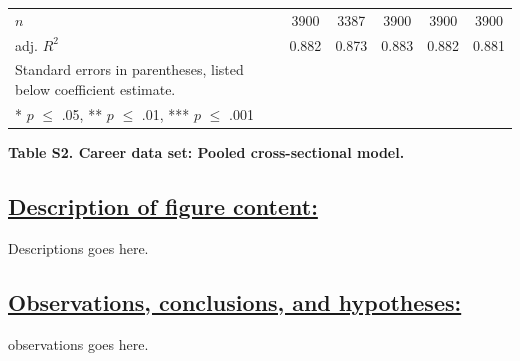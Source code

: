\documentclass{article}\usepackage[]{graphicx}\usepackage[]{color}
\begin{document}
\begin{table}[h!]
\begin{center}
\begin{tabular}{l c c c c c}
    \hline
    
    \rowcolor{gray!33} 
    $\textit{n}$
    & 3900 & 3387 & 3900 & 3900 & 3900 \\
    
    \rowcolor{gray!33} 
    adj. ${R^2}$ 
    & 0.882 & 0.873 & 0.883 & 0.882 & 0.881 \\
    
    \hline
    \hline
    
    Standard errors in parentheses, listed below coefficient estimate. \\
    {* $\textit{p}$ $\leq$ .05, ** $\textit{p}$ $\leq$ .01, *** $\textit{p}$ $\leq$ .001}
    
  \end{tabular}
  \end{center}
\end{table}
\begin{center}
\par{\textbf{Table S2. Career data set: Pooled cross-sectional model.}}
\end{center}
\subsection*{\underline{Description of figure content:}}
\par{
Descriptions goes here.
}
\subsection*{\underline{Observations, conclusions, and hypotheses:}}
\par{
observations goes here.
}

\newpage
\end{document}

